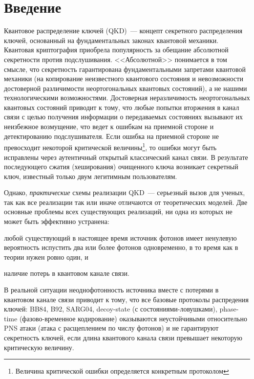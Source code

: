 \section*{Введение}				%

Квантовое распределение ключей (QKD)~--- концепт секретного распределения ключей, основанный на фундаментальных законах квантовой механики.
Квантовая криптография приобрела популярность за обещание абсолютной секретности против подслушивания. <<Абсолютной>> понимается в том смысле, что секретность гарантирована
фундаментальными запретами квантовой механики (на копирование неизвестного квантового состояния и невозможности достоверной различимости неортогональных квантовых состояний), 
а не нашими технологическими возможностями. Достоверная неразличимость неортогональных квантовых состояний приводит к тому, что любые попытки вторжения в канал связи с целью получения информации о передаваемых состояниях вызывают их неизбежное возмущение, что ведет к ошибкам на приемной стороне и детектированию подслушивателя.
Если ошибка на приемной стороне не превосходит некоторой критической величины\footnote{Величина критической ошибки определяется конкретным протоколом}, то ошибки могут быть исправлены через аутентичный открытый классический канал связи. В результате последующего сжатия (хеширования) очищенного ключа возникает секретный ключ, известный только двум легитимным пользователям.

Однако, \textit{практические} схемы реализации QKD~--- серьезный вызов для ученых, так как все реализации так или иначе отличаются от теоретических моделей. 
Две основные проблемы всех существующих реализаций, ни одна из которых не может быть эффективно устранена: 
\begin{inparaenum}[\itshape 1\upshape)]
\item любой существующий в настоящее время источник фотонов имеет ненулевую вероятность испустить два или более фотонов одновременно, в то время как в теории нужен ровно один, и
\item наличие потерь в квантовом канале связи.
\end{inparaenum}

В реальной ситуации неоднофотонность источника вместе с потерями в квантовом канале связи приводит к тому, что все базовые протоколы распредения ключей: BB84, B92, SARG04, decoy-state (с состояниями-ловушками), phase-time (фазово-временное кодирование) оказываются неустойчивыми относительно PNS атаки (атака с расщеплением по числу фотонов) и не гарантируют секретность ключей, если длина квантового канала связи превышает некоторую критическую величину. 

